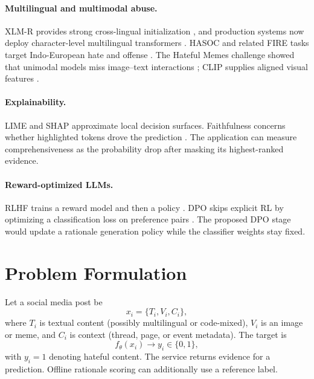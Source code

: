 \documentclass[11pt]{article}
\begin{document}
\paragraph{Multilingual and multimodal abuse.}
XLM-R provides strong cross-lingual initialization \cite{conneau2020xlmr}, and production systems now deploy character-level multilingual transformers \cite{lees2022perspective}. HASOC and related FIRE tasks target Indo-European hate and offense \cite{mandl2019hasoc}. The Hateful Memes challenge showed that unimodal models miss image--text interactions \cite{kiela2020hatefulmemes,gomez2020exploring}; CLIP supplies aligned visual features \cite{radford2021clip}.

\paragraph{Explainability.}
LIME \cite{ribeiro2016lime} and SHAP \cite{lundberg2017shap} approximate local decision surfaces. Faithfulness concerns whether highlighted tokens drove the prediction \cite{jacovi2020faithfulness}. The application can measure comprehensiveness as the probability drop after masking its highest-ranked evidence.

\paragraph{Reward-optimized LLMs.}
RLHF trains a reward model and then a policy \cite{ouyang2022instructgpt}. DPO skips explicit RL by optimizing a classification loss on preference pairs \cite{rafailov2023dpo}. The proposed DPO stage would update a rationale generation policy while the classifier weights stay fixed.

\section{Problem Formulation}

Let a social media post be
\begin{equation}
x_i = \{T_i, V_i, C_i\},
\end{equation}
where \(T_i\) is textual content (possibly multilingual or code-mixed), \(V_i\) is an image or meme, and \(C_i\) is context (thread, page, or event metadata). The target is
\begin{equation}
f_\theta(x_i) \rightarrow y_i \in \{0,1\},
\end{equation}
with \(y_i=1\) denoting hateful content. The service returns evidence for a prediction. Offline rationale scoring can additionally use a reference label.
\end{document}
